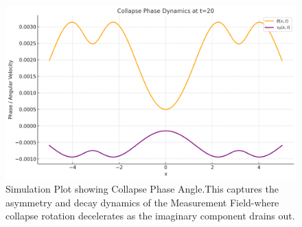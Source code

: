 \begin{figure}[H]
  \centering
    \includegraphics[width=\linewidth]{images/Collapse_phase.png}
    \caption{Simulation Plot showing Collapse Phase Angle.This captures the asymmetry and decay dynamics of the Measurement Field-where collapse rotation decelerates as the imaginary component drains out.}
\end{figure} \cite{chapter_time}


\nocite{*}
\printbibliography[title={Appendix B References}, keyword=chapter2]
